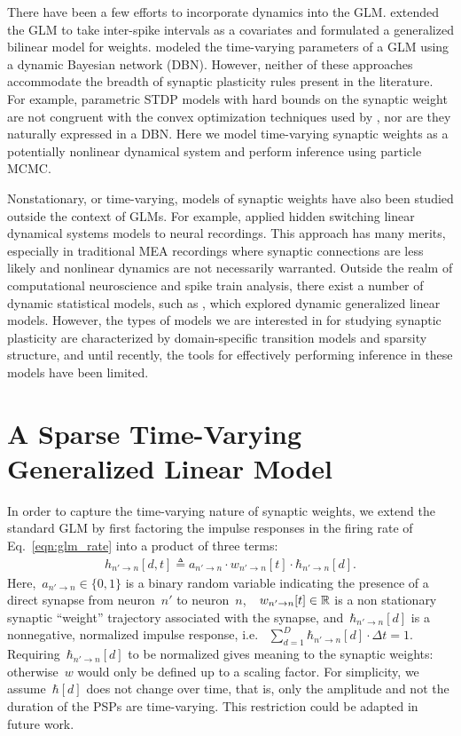 There have been a few efforts to incorporate dynamics into the
GLM. \citet{Stevenson-2011} extended the GLM to take inter-spike
intervals as a covariates and formulated a generalized bilinear model
for weights. \citet{Eldawlatly-2010} modeled the time-varying
parameters of a GLM using a dynamic Bayesian network (DBN). However,
neither of these approaches accommodate the breadth of synaptic
plasticity rules present in the literature. For example, parametric
STDP models with hard bounds on the synaptic weight are not congruent
with the convex optimization techniques used by \cite{Stevenson-2011},
nor are they naturally expressed in a DBN. Here we model time-varying
synaptic weights as a potentially nonlinear dynamical system and
perform inference using particle MCMC.

Nonstationary, or time-varying, models of synaptic weights have also
been studied outside the context of GLMs. For example,
\citet{Petreska-2011} applied hidden switching linear dynamical
systems models to neural recordings. This approach has many merits,
especially in traditional MEA recordings where synaptic connections
are less likely and nonlinear dynamics are not necessarily
warranted. Outside the realm of computational neuroscience and spike
train analysis, there exist a number of dynamic statistical models,
such as \citet{West-1985}, which explored dynamic generalized linear
models. However, the types of models we are interested in for studying
synaptic plasticity are characterized by domain-specific transition
models and sparsity structure, and until recently, the tools for
effectively performing inference in these models have been limited.


\section{A Sparse Time-Varying Generalized Linear Model}
In order to capture the time-varying nature of synaptic weights, we
extend the standard GLM by first factoring the impulse responses in
the firing rate of Eq.~\ref{eqn:glm_rate} into a product of three
terms:
\begin{align}
\label{eqn:tvwglm_ir}
h_{n' \to n}[d, t] \triangleq a_{n'\to n} \cdot w_{n' \to n}[t] \cdot \hbar_{n' \to n}[d].
\end{align}
Here,~${a_{n'\to n}\in\{0,1\}}$ is a binary random variable indicating
the presence of a direct synapse from neuron~$n'$ to
neuron~$n$,~~${w_{n'\to n}[t] \in \mathbb{R}}$ is a non stationary
synaptic ``weight'' trajectory associated with the synapse, and~$\hbar_{n'
  \to n}[d]$ is a nonnegative, normalized impulse response,
i.e. ~${\sum_{d=1}^D \hbar_{n' \to n}[d] \cdot \Delta t =
  1}$. Requiring~${\hbar_{n' \to n}[d]}$ to be normalized gives
meaning to the synaptic weights: otherwise~$w$ would only be defined
up to a scaling factor. For simplicity, we assume~$\hbar[d]$ does
not change over time, that is, only the amplitude and not the duration
of the PSPs are time-varying. This restriction could be adapted in
future work.

